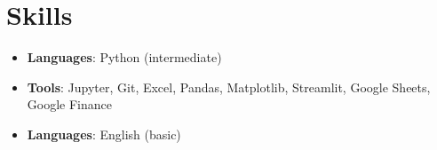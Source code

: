 \documentclass[11pt, a4paper]{article}
\newcommand{\cvitem}[2]{\textbf{#1} \hfill \color{secondary}#2} %
\begin{document}

\section*{Skills}
\begin{itemize}[leftmargin=*]
    \item \textbf{Languages}: Python (intermediate)
    \item \textbf{Tools}: Jupyter, Git, Excel, Pandas, Matplotlib, Streamlit, Google Sheets, Google Finance
    \item \textbf{Languages}: English (basic)
\end{itemize}

\end{document}
